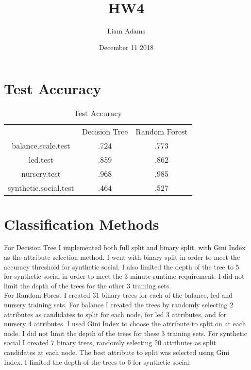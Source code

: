 \documentclass{article}
\title{HW4}
\author{Liam Adams}
\date{December 11 2018}
\begin{document}
\maketitle

\section*{Test Accuracy}
\begin{table}[htbp]
\caption{Test Accuracy}
\begin{tabular}{ |c|c|c| }
 \hline
   & Decision Tree & Random Forest\\
 balance.scale.test & .724 & .773 \\
 led.test & .859 & .862 \\
 nursery.test & .968 & .985 \\
 synthetic.social.test & .464 & .527 \\
 \hline
\end{tabular}
\end{table}
\section*{Classification Methods}
For Decision Tree I implemented both full split and binary split, with Gini Index as the attribute selection method.  I went with binary split in order to meet the accuracy threshold for synthetic social.  I also limited the depth of the tree to 5 for synthetic social in order to meet the 3 minute runtime requirement.  I did not limit the depth of the trees for the other 3 training sets.\\
For Random Forest I created 31 binary trees for each of the balance, led and nursery training sets.  For balance I created the trees by randomly selecting 2 attributes as candidates to split for each node, for led 3 attributes, and for nursery 4 attributes.  I used Gini Index to choose the attribute to split on at each node.  I did not limit the depth of the trees for these 3 training sets.  For synthetic social I created 7 binary trees, randomly selecting 20 attributes as split candidates at each node.  The best attribute to split was selected using Gini Index.  I limited the depth of the trees to 6 for synthetic social.
\end{document}
